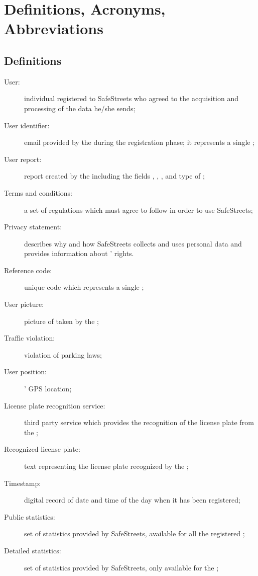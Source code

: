 \documentclass[../../DD.tex]{subfiles}
\begin{document}
\section{Definitions, Acronyms, Abbreviations\label{sect:1.3}}

\subsection{Definitions\label{sect:1.3.1}}
\begin{description}
	\item[User:] individual registered to SafeStreets who agreed to the acquisition and processing of the data he/she sends;
	\item[User identifier:] email provided by the  during the registration phase; it represents a single ;
	\item[User report:] report created by the  including the fields , , ,  and type of ;
	\item[Terms and conditions:] a set of regulations which  must agree to follow	in order to use SafeStreets;
	\item[Privacy statement:] describes why and how SafeStreets collects and uses personal data and provides information about ' rights.
	\item[Reference code:] unique code which represents a single ;
	\item[User picture:] picture of  taken by the ;
	\item[Traffic violation:] violation of parking laws;
	\item[User position:] ' GPS location;
	\item[License plate recognition service:] third party service which provides the recognition of the license plate from the ;
	\item[Recognized license plate:] text representing the license plate recognized by the ;
	\item[Timestamp:] digital record of date and time of the day when it has been registered;
	\item[Public statistics:] set of  statistics provided by SafeStreets, available for all the registered ;
	\item[Detailed statistics:] set of  statistics provided by SafeStreets, only available for the ;

\end{description}
\end{document}
